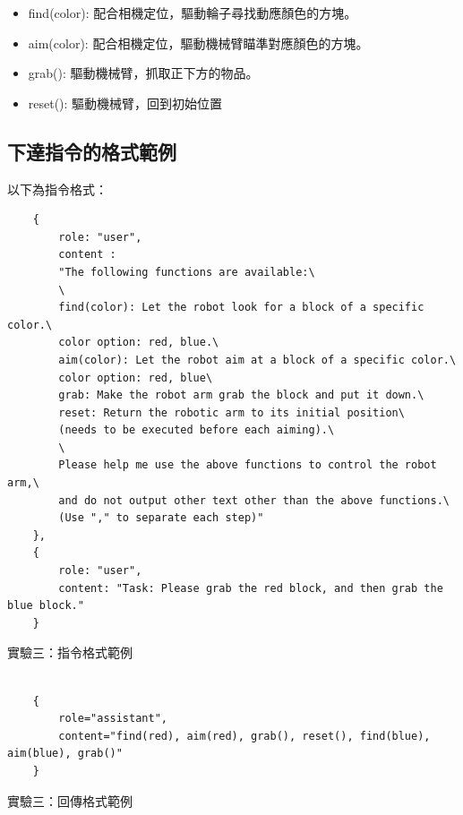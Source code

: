 \documentclass[class=NCU_thesis, crop=false]{standalone}
\begin{document}
\begin{itemize}
    \item find(color): 配合相機定位，驅動輪子尋找動應顏色的方塊。

    \item aim(color): 配合相機定位，驅動機械臂瞄準對應顏色的方塊。

    \item grab(): 驅動機械臂，抓取正下方的物品。

    \item reset(): 驅動機械臂，回到初始位置
\end{itemize}

\newpage
\subsection{下達指令的格式範例}
以下為指令格式：
\begin{listing}[h]
    \begin{verbatim}
    {     
        role: "user",
        content : 
        "The following functions are available:\
        \
        find(color): Let the robot look for a block of a specific color.\
        color option: red, blue.\
        aim(color): Let the robot aim at a block of a specific color.\
        color option: red, blue\
        grab: Make the robot arm grab the block and put it down.\
        reset: Return the robotic arm to its initial position\
        (needs to be executed before each aiming).\
        \
        Please help me use the above functions to control the robot arm,\
        and do not output other text other than the above functions.\
        (Use "," to separate each step)"
    },
    {
        role: "user", 
        content: "Task: Please grab the red block, and then grab the blue block."
    }
    \end{verbatim}
\caption{實驗三：指令格式範例} 
\end{listing}

\begin{listing}[h]
    \begin{verbatim}

    {
        role="assistant",
        content="find(red), aim(red), grab(), reset(), find(blue), aim(blue), grab()"
    }

    \end{verbatim}
\caption{實驗三：回傳格式範例} 
\end{listing}
\end{document}
